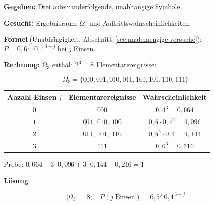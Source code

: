 \begin{beispiel}

\textbf{Gegeben:} Drei aufeinanderfolgende, unabhängige Symbole.

\textbf{Gesucht:} Ergebnisraum $\Omega_3$ und Auftrittswahrscheinlichkeiten.

\textbf{Formel} (Unabhängigkeit, Abschnitt~\ref{sec:unabhaengige-versuche}):
$P = 0{,}6^{\,j}\cdot 0{,}4^{\,3-j}$ bei $j$ Einsen.

\textbf{Rechnung:} $\Omega_3$ enthält $2^{3}=8$ Elementarereignisse:

$$
\Omega_3 = \{000,001,010,011,100,101,110,111\}
$$

\begin{center}
\renewcommand{\arraystretch}{1.2}
\begin{tabular}{c|c|c}
Anzahl Einsen $j$ & Elementarereignisse & Wahrscheinlichkeit \\
\hline
$0$ & $000$ & $0{,}4^{3} = 0{,}064$ \\
$1$ & $001,\,010,\,100$ & $0{,}6\cdot 0{,}4^{2} = 0{,}096$ \\
$2$ & $011,\,101,\,110$ & $0{,}6^{2}\cdot 0{,}4 = 0{,}144$ \\
$3$ & $111$ & $0{,}6^{3} = 0{,}216$ \\
\end{tabular}
\end{center}

Probe: $0{,}064 + 3\cdot 0{,}096 + 3\cdot 0{,}144 + 0{,}216 = 1$ \checkmark

\textbf{Lösung:}

$$
\boxed{|\Omega_3| = 8;\quad P(j\text{ Einsen}) = 0{,}6^{\,j}\,0{,}4^{\,3-j}}
$$

\end{beispiel}


